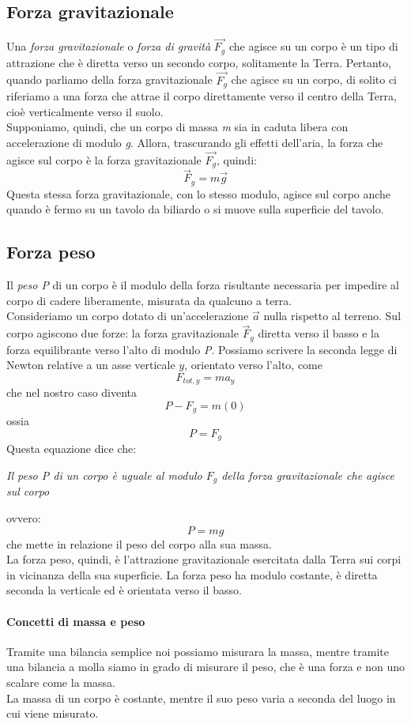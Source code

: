 \documentclass[12pt]{report}
\begin{document}
	\subsection{Forza gravitazionale}
	Una \textit{forza gravitazionale} o \textit{forza di gravità} $\vec{F_g}$ che agisce su un corpo è un tipo di attrazione che è diretta verso un secondo corpo, solitamente la Terra. Pertanto, quando parliamo della forza gravitazionale $\vec{F_g}$ che agisce su un corpo, di solito ci riferiamo a una forza che attrae il corpo direttamente verso il centro della Terra, cioè verticalmente verso il suolo. \\
	Supponiamo, quindi, che un corpo di massa \textit{m} sia in caduta libera con accelerazione di modulo \textit{g}. Allora, trascurando gli effetti dell'aria, la forza che agisce sul corpo è la forza gravitazionale $\vec{F_g}$, quindi:
	\[
	\vec{F}_g = m\vec{g}
	\]
	Questa stessa forza gravitazionale, con lo stesso modulo, agisce sul corpo anche quando è fermo su un tavolo da biliardo o si muove sulla superficie del tavolo.
	\subsection{Forza peso}
	Il \textit{peso P} di un corpo è il modulo della forza risultante necessaria per impedire al corpo di cadere liberamente, misurata da qualcuno a terra. \\
	Consideriamo un corpo dotato di un'accelerazione $\vec{a}$ nulla rispetto al terreno. Sul corpo agiscono due forze: la forza gravitazionale $\vec{F}_g$ diretta verso il basso e la forza equilibrante verso l'alto di modulo \textit{P}. Possiamo scrivere la seconda legge di Newton relative a un asse verticale $y$, orientato verso l'alto, come
	\[
	F_{tot, y}  = ma_y
	\]
	che nel nostro caso diventa
	\[
	P - F_g = m(0)
	\]
	ossia
	\[
	P = F_g
	\]
	Questa equazione dice che:
	\begin{center}
		\textit{Il peso P di un corpo è uguale al modulo $F_g$ della forza gravitazionale che agisce sul corpo}
	\end{center}
	ovvero:
	\[
	P = mg
	\]
	che mette in relazione il peso del corpo alla sua massa. \\
	La forza peso, quindi, è l'attrazione gravitazionale esercitata dalla Terra sui corpi in vicinanza della sua superficie. La forza peso ha modulo costante, è diretta seconda la verticale ed è orientata verso il basso.
	\paragraph{Concetti di massa e peso} Tramite una bilancia semplice noi possiamo misurara la massa, mentre tramite una bilancia a molla siamo in grado di misurare il peso, che è una forza e non uno scalare come la massa. \\
	La massa di un corpo è costante, mentre il suo peso varia a seconda del luogo in cui viene misurato.
\end{document}
